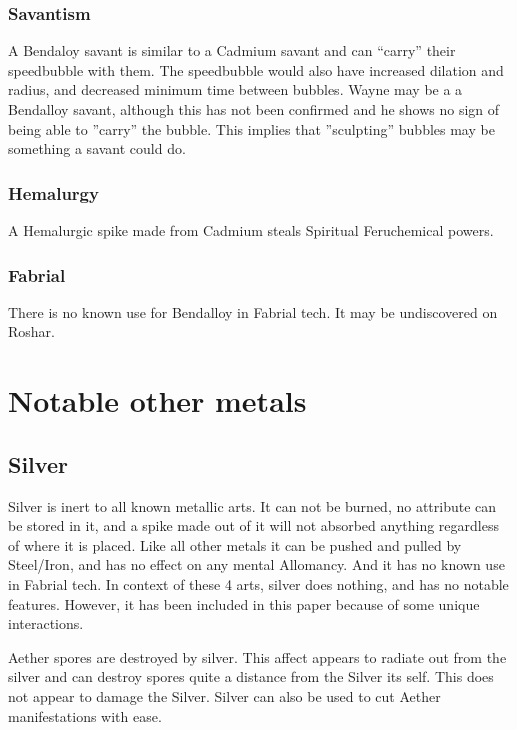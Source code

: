 \documentclass[conference]{IEEEtran}
\newcommand{\n}{\hfill\break}
\begin{document}
\subsubsection*{\textbf{Savantism}}
A Bendaloy savant is similar to a Cadmium savant and can ``carry'' their speedbubble with them.\cite{Bubble-move}  The speedbubble would also have increased dilation and radius,\cite{bubble-savant} and decreased minimum time between bubbles.\cite{TLM-CH8}  Wayne may be a a Bendalloy savant, although this has not been confirmed and he shows no sign of being able to ''carry'' the bubble.\cite{TLM-CH8}\cite{TLM-CH49}\cite{TLM-CH71} This implies that ''sculpting'' bubbles may be something a savant could do.\\
\subsubsection*{\textbf{Hemalurgy}}
A Hemalurgic spike made from Cadmium steals Spiritual Feruchemical powers.\cite{HE-TB}\\
\subsubsection*{\textbf{Fabrial}}
There is no known use for Bendalloy in Fabrial tech.  It may be undiscovered on Roshar.
\n\n
\section{\textbf{Notable other metals}}
\subsection*{\textbf{Silver}}
Silver is inert to all known metallic arts.\cite{HoA-CH60}  It can not be burned,\cite{AL-TB} no attribute can be stored in it,\cite{FE-TB} and a spike made out of it will not absorbed anything regardless of where it is placed.\cite{HE-TB}  Like all other metals it can be pushed and pulled by Steel/Iron,\cite{SoS-CH2} and has no effect on any mental Allomancy.\cite{silver-no-special}  And it has no known use in Fabrial tech.  In context of these 4 arts, silver does nothing, and has no notable features.\cite{no-silver-al}  However, it has been included in this paper because of some unique interactions. 

Aether spores are destroyed by silver.\cite{ToES-CH1}  This affect appears to radiate out from the silver and can destroy spores quite a distance from the Silver its self.\cite{ToES-CH10}  This does not appear to damage the Silver.  Silver can also be used to cut Aether manifestations with ease.\\
\end{document}
